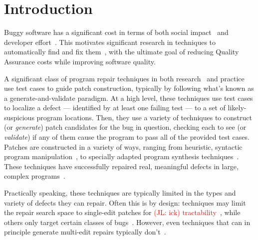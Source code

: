 \documentclass[sigconf, timestamp-false, anonymous=true]{acmart}
\newcommand\todo[1]{\textcolor{red}{#1}}
\begin{document}

\maketitle


\newcommand{\rqorinsight}[2]{
  \setlength{\fboxsep}{0.8em}
  \vspace{0.5em}
  \begin{center}
  \Ovalbox{\begin{minipage}{0.9\linewidth}
    \textbf{Research Question:} #1
    \end{minipage}}
  \end{center}
  \vspace{0.5em}}

\section{Introduction}

Buggy software has a significant cost in terms of both social impact~\cite{tricentis} 
and developer effort~\cite{cambridge-study}. This
motivates significant research in techniques to automatically find and fix
them~\cite{whatever}, with the ultimate goal of reducing Quality Assurance costs
while improving software quality. 

A significant class of program repair techniques in both
research~\cite{genprog,angelix,Le17, Xuan17} and practice~\cite{sapfix} use test cases to guide
patch construction, typically by following what's known as a
generate-and-validate paradigm. At a high level, these techniques use test cases
to localize a defect --- identified by at least one failing test --- to a set of
likely-suspicious program locations. Then, they use a variety of techniques to
construct (or \emph{generate}) patch candidates for the bug in question,
checking each to see (or \emph{validate}) if any of them cause the program to
pass all of the provided test cases.  
%
Patches are constructed in a variety of ways, ranging from heuristic, syntactic
program manipulation~\cite{par,genprog,rsrepair,ae,prophet,hdrepair}, to specially adapted program
synthesis techniques~\cite{Konighofer11,Konighofer12,semfix,DeMarco14,angelix}. These techniques have successfully
repaired real, meaningful defects in large, complex
programs~\cite{angelix,genprog-eight-dollars,prophet,sapfix}.

Practically speaking, these techniques are typically limited in the types and
variety of defects they can repair. Often this is by design: techniques may
limit the repair search space to single-edit patches for \todo{(JL: ick)
  tractability}~\cite{rsrepair,ae,hdrepair}, while others only target certain
classes of bugs~\cite{Xuan17,sapfix,DeMarco14,par}. However, even techniques
that can in principle generate multi-edit repairs typically
don't~\cite{genprog,others}.
\end{document}
